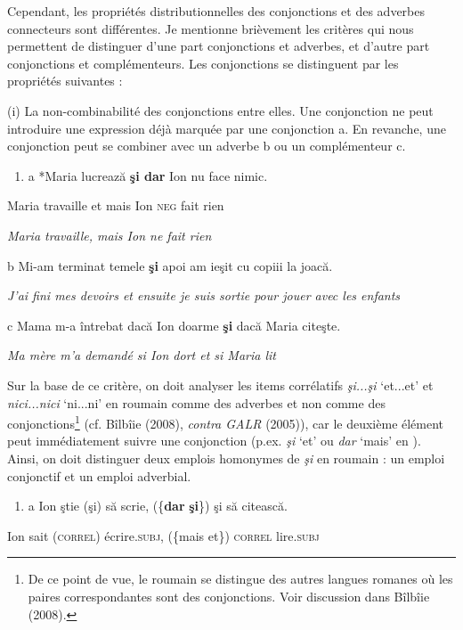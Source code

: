 Cependant, les propriétés distributionnelles des conjonctions et des adverbes connecteurs sont différentes. Je mentionne brièvement les critères qui nous permettent de distinguer d'une part conjonctions et adverbes, et d'autre part conjonctions et complémenteurs. Les conjonctions se distinguent par les propriétés suivantes :

(i) La non-combinabilité des conjonctions entre elles. Une conjonction ne peut introduire une expression déjà marquée par une conjonction a. En revanche, une conjonction peut se combiner avec un adverbe b ou un complémenteur c. 


\begin{enumerate}
\item \label{bkm:Ref300166642}a  *Maria  lucrează  \textbf{şi  dar } Ion  nu  face  nimic.


\end{enumerate}
Maria  travaille  et  mais  Ion  \textsc{neg } fait  rien 

{\itshape
Maria travaille, mais Ion ne fait rien}

  b  Mi-am terminat temele \textbf{şi} apoi am ieşit cu copiii la joacă.

    \textit{J'ai fini mes devoirs et ensuite je suis sortie pour jouer avec les enfants}

  c  Mama m-a întrebat dacă Ion doarme \textbf{şi} dacă Maria citeşte.

{\itshape
    Ma mère m'a demandé si Ion dort et si Maria lit}

Sur la base de ce critère, on doit analyser les items corrélatifs \textit{şi...şi} `et...et' et \textit{nici...nici} `ni...ni' en roumain comme des adverbes et non comme des conjonctions\footnote{De ce point de vue, le roumain se distingue des autres langues romanes où les paires correspondantes sont des conjonctions. Voir discussion dans Bîlbîie (2008).}  (cf. Bîlbîie (2008), \textit{contra GALR} (2005)), car le deuxième élément peut immédiatement suivre une conjonction (p.ex. \textit{şi} `et' ou \textit{dar} `mais' en ). Ainsi, on doit distinguer deux emplois homonymes de \textit{şi} en roumain : un emploi conjonctif et un emploi adverbial.


\begin{enumerate}
\item \label{bkm:Ref300305729}a  Ion  ştie  (şi)  să scrie,  (\{\textbf{dar}  {\textbar} \textbf{şi}\})  şi  să citească.


\end{enumerate}
Ion  sait  (\textsc{correl) } écrire.\textsc{subj},  (\{mais  {\textbar} et\})  \textsc{correl}  lire.\textsc{subj} 

